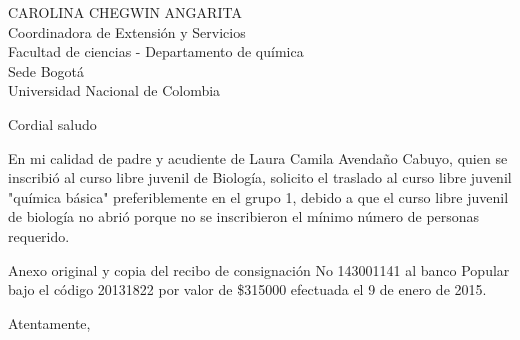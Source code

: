 \documentclass[letterpaper,spanish,11pt]{letter}
\date{5 de marzo de 2015}
\begin{document}
\begin{letter}{CAROLINA CHEGWIN ANGARITA\\Coordinadora de  Extensión y Servicios\\Facultad de ciencias - Departamento de química\\Sede Bogotá\\Universidad Nacional de Colombia}
	
\opening{Cordial saludo}
En mi calidad de padre y acudiente de Laura Camila Avendaño Cabuyo, quien se inscribió al curso libre juvenil de Biología, solicito el traslado al curso libre juvenil "química básica" preferiblemente en el grupo 1, debido a que el curso libre juvenil de biología no abrió porque no se inscribieron el mínimo número de personas requerido.

Anexo original y copia del recibo de consignación No 143001141 al banco Popular bajo el código 20131822 por valor de \$315000 efectuada el 9 de enero de 2015.
\closing{Atentamente,}


\end{letter}
\end{document}
